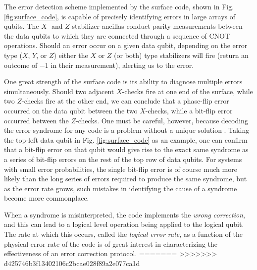 The error detection scheme implemented by the surface code, shown in Fig.
\ref{fig:surface_code}, is capable of precisely identifying errors in large
arrays of qubits. The $X$- and $Z$-stabilizer ancillas conduct parity
measurements between the data qubits to which they are connected through a
sequence of CNOT operations. Should an error occur on a given data qubit,
depending on the error type ($X$, $Y$, or $Z$) either the $X$ or $Z$ (or both)
type stabilizers will fire (return an outcome of $-1$ in their measurement),
alerting us to the error.

One great strength of the surface code is its ability to diagnose multiple
errors simultaneously. Should two adjacent $X$-checks fire at one end of the
surface, while two $Z$-checks fire at the other end, we can conclude that a
phase-flip error occurred on the data qubit between the two $X$-checks, while a
bit-flip error occurred between the $Z$-checks. One must be careful, however,
because decoding the error syndrome for any code is a problem without a unique
solution \cite{terhal15}. Taking the top-left data qubit in Fig. \ref{fig:surface_code} as an
example, one can confirm that a bit-flip error on that qubit would give rise to
the exact same syndrome as a series of bit-flip errors on the rest of the top
row of data qubits. For systems with small error probabilities, the single
bit-flip error is of course much more likely than the long series of errors
required to produce the same syndrome, but as the error rate grows, such
mistakes in identifying the cause of a syndrome become more commonplace. 

When a syndrome is misinterpreted, the code implements the \textit{wrong
  correction}, and this can lead to a logical level operation being applied to
the logical qubit. The rate at which this occurs, called the \textit{logical
  error rate}, as a function of the physical error rate of the code is of great
interest in characterizing the effectiveness of an error correction protocol.
=======
>>>>>>> d425746b3f13402106c2bcae028f89a2e077ca1d


